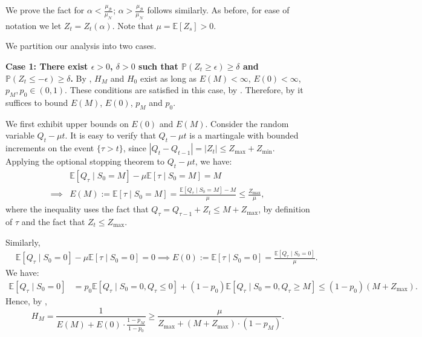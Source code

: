 \documentclass[mnsc,nonblindrev]{informs3}
\newcommand{\E}{\mathbb{E}}
\newcommand{\pr}{\mathbb{P}}
\renewcommand{\Pr}{\pr}
\newcommand{\NDist}{\mathcal{N}}
\newcommand{\BDist}{\mathcal{B}}
\newcommand{\Nmean}{\mu_{\NDist}}
\newcommand{\Bmean}{\mu_{\BDist}}
\newcommand{\Exp}[1]{\mathbb{E} \left[ #1 \right]} %
\renewenvironment{proof}[1][Proof]{%
  \par\noindent{\itshape #1.} \ignorespaces
}{%
  \hfill\Halmos\par
}
\begin{document}
\begin{APPENDICES}
\InefficiencyDrift*


\begin{proof}%
%
We prove the fact for $\alpha < \frac{\Bmean}{\Nmean}$; $\alpha > \frac{\Bmean}{\Nmean}$ follows similarly. As before, for ease of notation we let $Z_t = Z_t(\alpha)$.  Note that $\mu = \Exp{Z_s} > 0$. 

We partition our analysis into two cases.

\smallskip 

 {\bf Case 1: There exist $\epsilon > 0$, $\delta > 0$ such that $\Pr(Z_t \geq \epsilon) \geq \delta$ and $\Pr(Z_t \leq - \epsilon) \geq \delta$.} By , $H_M$ and $H_0$ exist as long as $E(M) < \infty$, $E(0) < \infty$, $p_M, p_0 \in (0,1)$. These conditions are satisfied in this case, by . Therefore, by  it suffices to bound $E(M)$, $E(0)$, $p_M$ and $p_0$. 


We first exhibit upper bounds on $E(0)$ and $E(M)$. Consider the random variable $Q_t - \mu t$. It is easy to verify that $Q_t - \mu t$ is a martingale with bounded increments on the event $\{\tau > t\}$, since $|Q_t - Q_{t-1}| = |Z_t| \leq Z_{\max} + Z_{\min}$. Applying the optional stopping theorem to $Q_t - \mu t$, we have:
\begin{align*}
&\E[Q_\tau \mid S_0 = M] - \mu \E[\tau \mid S_0 = M] = M \\
\implies &E(M) := \E[\tau \mid S_0 = M] = \frac{\E[Q_\tau \mid S_0 = M]-M}{\mu} \leq \frac{Z_{\max}}{\mu},
\end{align*}
where the inequality uses the fact that $Q_{\tau} = Q_{\tau - 1}+Z_t \leq M + Z_{\max}$, by definition of $\tau$ and the fact that $Z_t \leq Z_{\max}$.

Similarly,
\begin{align*}
&\E[Q_\tau \mid S_0 = 0] - \mu\E[\tau \mid S_0 = 0] = 0 
\implies E(0) := \E[\tau \mid S_0 = 0] = \frac{\E[Q_\tau \mid S_0 = 0]}{\mu}.
\end{align*}
%
We have:
\begin{align*}
\E[Q_\tau \mid S_0 = 0] &= p_0 \E[Q_\tau \mid S_0 = 0, Q_\tau \leq 0] + (1-p_0)\E[Q_\tau \mid S_0 = 0, Q_\tau \geq M] \leq (1-p_0)\left(M+Z_{\max}\right).
\end{align*}
%
Hence, by ,
\begin{equation}
\label{eq:h_m_bound_non_zero_mean}
H_M = \frac{1}{E(M) + E(0)\cdot \frac{1-p_M}{1-p_{0}}} \geq \frac{\mu}{ Z_{\max} + (M + Z_{\max}) \cdot(1-p_M)}.
\end{equation}


\end{proof}
\end{APPENDICES}
\end{document}

